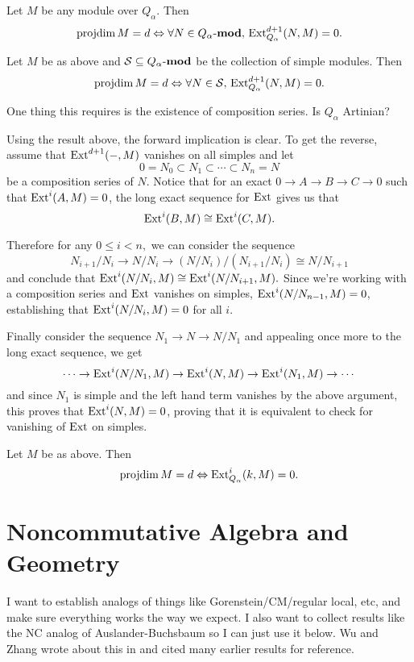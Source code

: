 \documentclass[12pt]{article}
\begin{document}
\begin{lem}
    Let $M$ be any module over $Q_\alpha$. Then
    \[\operatorname{projdim} M=d \Leftrightarrow \forall N\in Q_\alpha\text{-}\mathbf{mod},\,\operatorname{Ext}^{d+1}_{Q_\alpha}(N,M)=0.\]
\end{lem}
\begin{lem}
    Let $M$ be as above and $\mathcal{S}\subseteq Q_\alpha\text{-}\mathbf{mod}$ be the collection of simple modules. Then
    \[\operatorname{projdim} M=d \Leftrightarrow \forall N\in\mathcal{S},\,\operatorname{Ext}^{d+1}_{Q_\alpha}(N,M)=0.\]
\end{lem}
{\color{red} One thing this requires is the existence of composition series. Is $Q_\alpha$ Artinian?}
\begin{prf}
    Using the result above, the forward implication is clear. To get the reverse, assume that $\operatorname{Ext}^{d+1}(-,M)$ vanishes on all simples and let
    \[0=N_0\subset N_1\subset\cdots\subset N_n=N\]
    be a composition series of $N$. Notice that for an exact $0\to A\to B\to C\to 0$ such that $\operatorname{Ext}^i(A,M)=0$, the long exact sequence for $\operatorname{Ext}$ gives us that
    \[\operatorname{Ext}^i(B,M)\cong\operatorname{Ext}^i(C,M).\]
    
    Therefore for any $0\le i< n,$ we can consider the sequence 
    \[N_{i+1}/N_i \to N/N_i\to (N/N_i)/(N_{i+1}/N_i)\cong N/N_{i+1}\]
    and conclude that $\operatorname{Ext}^i(N/N_i, M)\cong \operatorname{Ext}^i(N/N_{i+1},M).$ Since we're working with a composition series and $\operatorname{Ext}$ vanishes on simples, $\operatorname{Ext}^i(N/N_{n-1},M)=0$, establishing that $\operatorname{Ext}^i(N/N_i,M)=0$ for all $i$.
    
    Finally consider the sequence $N_1\to N\to N/N_1$ and appealing once more to the long exact sequence, we get
    \[\cdots\to \operatorname{Ext}^i(N/N_1,M)\to \operatorname{Ext}^i(N,M)\to \operatorname{Ext}^i(N_1,M)\to \cdots\]
    and since $N_1$ is simple and the left hand term vanishes by the above argument, this proves that $\operatorname{Ext}^i(N,M)=0$, proving that it is equivalent to check for vanishing of $\operatorname{Ext}$ on simples.
\end{prf}
\begin{lem}
    Let $M$ be as above. Then
    \[\operatorname{projdim} M=d \Leftrightarrow \operatorname{Ext}_{Q_\alpha}^i(k,M)=0.\]
\end{lem}

\section{Noncommutative Algebra and Geometry}
I want to establish analogs of things like Gorenstein/CM/regular local, etc, and make sure everything works the way we expect. I also want to collect results like the NC analog of Auslander-Buchsbaum so I can just use it below. Wu and Zhang wrote about this in \cite{wu-zhang01} and cited many earlier results for reference.
\end{document}
